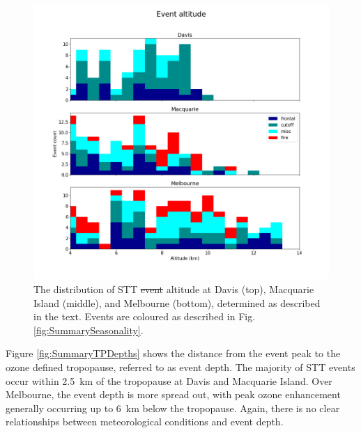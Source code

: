 \documentclass[acp, manuscript]{copernicus} %
\providecommand{\DIFadd}[1]{{\protect\color{blue}\uwave{#1}}} %
\providecommand{\DIFdel}[1]{{\protect\color{red}\sout{#1}}}                      %
\providecommand{\DIFaddFL}[1]{\DIFadd{#1}} %
\providecommand{\DIFdelFL}[1]{\DIFdel{#1}} %
\providecommand{\DIFaddbeginFL}{} %
\providecommand{\DIFaddendFL}{} %
\providecommand{\DIFdelbeginFL}{} %
\providecommand{\DIFdelendFL}{} %
\begin{document}
  \begin{figure}[t]
    \includegraphics[width=12cm]{figures/summary_altitude.png}
    \caption{The distribution of STT \DIFdelbeginFL \DIFdelFL{event }\DIFdelendFL \DIFaddbeginFL \DIFaddFL{events }\DIFaddendFL altitude at Davis (top), Macquarie Island (middle), and Melbourne (bottom), determined as described in the text.
    Events are coloured as described in Fig. \ref{fig:SummarySeasonality}.}
    \label{fig:SummaryAltitudes}
  \end{figure}

  Figure \ref{fig:SummaryTPDepths} shows the distance from the event peak to the ozone defined tropopause, referred to as event depth.
  The majority of STT events occur within 2.5~km of the tropopause at Davis and Macquarie Island. 
  Over Melbourne, the event depth is more spread out, with peak ozone enhancement generally occurring up to 6~km below the tropopause.
  Again, there is no clear relationships between meteorological conditions and event depth.
\end{document}

